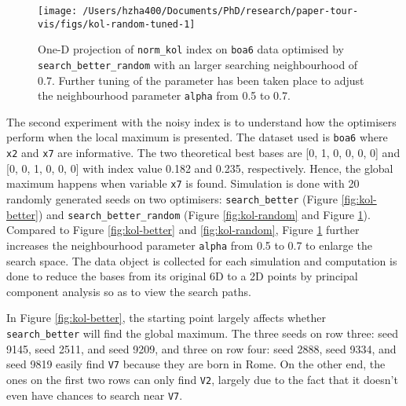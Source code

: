 \documentclass[12pt]{article}
\begin{document}
\begin{figure}

{\centering \texttt{[image: /Users/hzha400/Documents/PhD/research/paper-tour-vis/figs/kol-random-tuned-1]} 

}

\caption{One-D projection of \texttt{norm\_kol} index on \texttt{boa6} data optimised by \texttt{search\_better\_random} with an larger searching neighbourhood of 0.7. Further tuning of the parameter has been taken place to adjust the neighbourhood parameter \texttt{alpha} from 0.5 to 0.7.}\label{fig:kol-random-tuned}
\end{figure}



The second experiment with the noisy index is to understand how the optimisers perform when the local maximum is presented. The dataset used is \texttt{boa6} where \texttt{x2} and \texttt{x7} are informative. The two theoretical best bases are {[}0, 1, 0, 0, 0, 0{]} and {[}0, 0, 1, 0, 0, 0{]} with index value 0.182 and 0.235, respectively. Hence, the global maximum happens when variable \texttt{x7} is found. Simulation is done with 20 randomly generated seeds on two optimisers: \texttt{search\_better} (Figure \ref{fig:kol-better}) and \texttt{search\_better\_random} (Figure \ref{fig:kol-random} and Figure \ref{fig:kol-random-tuned}). Compared to Figure \ref{fig:kol-better} and \ref{fig:kol-random}, Figure \ref{fig:kol-random-tuned} further increases the neighbourhood parameter \texttt{alpha} from 0.5 to 0.7 to enlarge the search space. The data object is collected for each simulation and computation is done to reduce the bases from its original 6D to a 2D points by principal component analysis so as to view the search paths.

In Figure \ref{fig:kol-better}, the starting point largely affects whether \texttt{search\_better} will find the global maximum. The three seeds on row three: seed 9145, seed 2511, and seed 9209, and three on row four: seed 2888, seed 9334, and seed 9819 easily find \texttt{V7} because they are born in Rome. On the other end, the ones on the first two rows can only find \texttt{V2}, largely due to the fact that it doesn't even have chances to search near \texttt{V7}.
\end{document}
